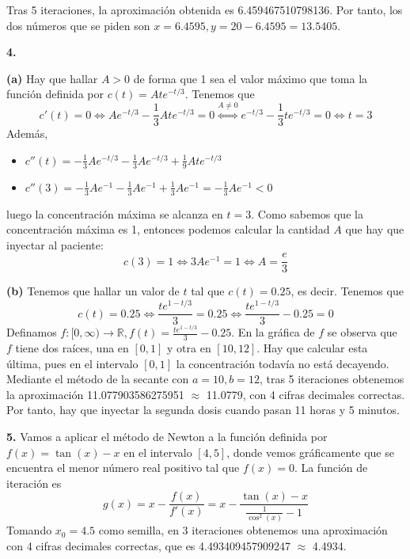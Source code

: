 \documentclass[12pt]{report}
\newcommand{\R}{\mathbb R}
\begin{document}
\vspace{2mm}
Tras 5 iteraciones, la aproximación obtenida es 6.459467510798136. Por tanto, los dos números que se piden son $x = 6.4595, y = 20-6.4595=13.5405$.

\vspace{6mm}
\textbf{4. } 

\vspace{2mm}
\textbf{(a) }Hay que hallar $A > 0$ de forma que 1 sea el valor máximo que toma la función definida por $c(t) = Ate^{-t/3}$. Tenemos que
\[c'(t)=0 \iff Ae^{-t/3} - \frac{1}{3}Ate^{-t/3} = 0 \overset{A \neq 0}{\iff} e^{-t/3} - \frac{1}{3}te^{-t/3} = 0 \iff t = 3\]
Además,
\begin{itemize}
    \item $c''(t) = -\frac{1}{3}Ae^{-t/3} - \frac{1}{3}Ae^{-t/3} + \frac{1}{9}Ate^{-t/3}$
    \item $c''(3) = -\frac{1}{3}Ae^{-1}-\frac{1}{3}Ae^{-1}+\frac{1}{3}Ae^{-1} = -\frac{1}{3}Ae^{-1} < 0$
\end{itemize}
luego la concentración máxima se alcanza en $t = 3$. Como sabemos que la concentración máxima es 1, entonces podemos calcular la cantidad $A$ que hay que inyectar al paciente:
\[c(3) = 1 \iff 3Ae^{-1} = 1 \iff A = \frac{e}{3}\]

\vspace{2mm}
\textbf{(b) } Tenemos que hallar un valor de $t$ tal que $c(t) = 0.25$, es decir. Tenemos que
\[c(t) = 0.25 \iff \frac{te^{1-t/3}}{3} = 0.25 \iff \frac{te^{1-t/3}}{3} - 0.25=0\]
Definamos $f \colon [0,\infty) \to \R, f(t) = \frac{te^{1-t/3}}{3} - 0.25$. En la gráfica de $f$ se observa que $f$ tiene dos raíces, una en $[0,1]$ y otra en $[10,12]$. Hay que calcular esta última, pues en el intervalo $[0,1]$ la concentración todavía no está decayendo. Mediante el método de la secante con $a = 10, b = 12$, tras 5 iteraciones obtenemos la aproximación 11.077903586275951 $\approx$ 11.0779, con 4 cifras decimales correctas. Por tanto, hay que inyectar la segunda dosis cuando pasan 11 horas y 5 minutos.

\vspace{6mm}
\textbf{5. } Vamos a aplicar el método de Newton a la función definida por $f(x) = \tan(x) - x$ en el intervalo $[4,5]$, donde vemos gráficamente que se encuentra el menor número real positivo tal que $f(x) = 0$. La función de iteración es
\[g(x) = x - \frac{f(x)}{f'(x)} = x - \frac{\tan(x)-x}{\frac{1}{\cos^2(x)}-1}\]
Tomando $x_0 = 4.5$ como semilla, en 3 iteraciones obtenemos una aproximación con 4 cifras decimales correctas, que es 4.493409457909247 $\approx$ 4.4934.
\end{document}
